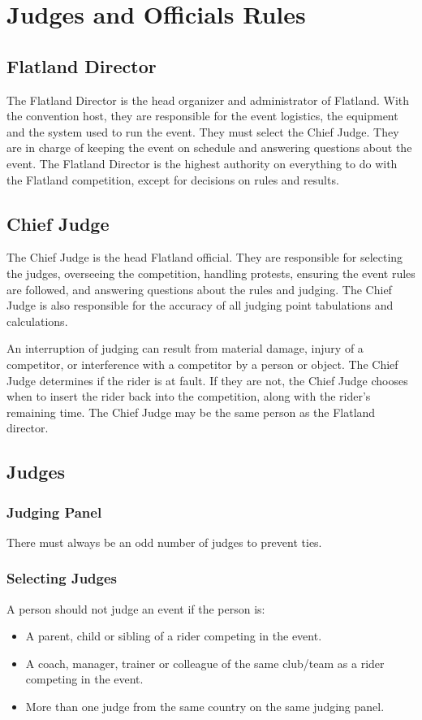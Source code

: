 \chapter{Judges and Officials Rules}

\section{Flatland Director}

The Flatland Director is the head organizer and administrator of Flatland.
With the convention host, they are responsible for the event logistics, the equipment and the system used to run the event.
They must select the Chief Judge.
They are in charge of keeping the event on schedule and answering questions about the event.
The Flatland Director is the highest authority on everything to do with the Flatland competition, except for decisions on rules and results.

\section{Chief Judge}

The Chief Judge is the head Flatland official.
They are responsible for selecting the judges, overseeing the competition, handling protests, ensuring the event rules are followed, and answering questions about the rules and judging.
The Chief Judge is also responsible for the accuracy of all judging point tabulations and calculations.

An interruption of judging can result from material damage, injury of a competitor, or interference with a competitor by a person or object.
The Chief Judge determines if the rider is at fault.
If they are not, the Chief Judge chooses when to insert the rider back into the competition, along with the rider's remaining time.
The Chief Judge may be the same person as the Flatland director.

\section{Judges}

\subsection{Judging Panel}

There must always be an odd number of judges to prevent ties.

\subsection{Selecting Judges}
A person should not judge an event if the person is:
\begin{itemize}
\item A parent, child or sibling of a rider competing in the event.
\item A coach, manager, trainer or colleague of the same club/team as a rider competing in the event.
\item More than one judge from the same country on the same judging panel.
\end{itemize}

